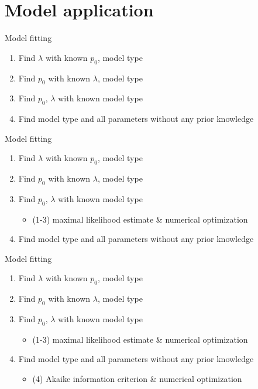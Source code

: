 \documentclass[american]{beamer}
\begin{document}
    \section{Model application}
    \begin{frame}{Model fitting}
        \begin{enumerate}
            \item Find $\lambda$ with known $p_{0}$, model type
            \item Find $p_{0}$ with known $\lambda$, model type
            \item Find $p_{0},\,\lambda$ with known model type
            \item Find model type and all parameters without any prior knowledge
        \end{enumerate}
    \end{frame}

    \begin{frame}{Model fitting}
        \begin{enumerate}
            \item Find $\lambda$ with known $p_{0}$, model type
            \item Find $p_{0}$ with known $\lambda$, model type
            \item Find $p_{0},\,\lambda$ with known model type
            \begin{itemize}
                \item (1-3) maximal likelihood estimate \& numerical optimization
            \end{itemize}
            \item Find model type and all parameters without any prior knowledge
        \end{enumerate}
    \end{frame}

    \begin{frame}{Model fitting}
        \begin{enumerate}
            \item Find $\lambda$ with known $p_{0}$, model type
            \item Find $p_{0}$ with known $\lambda$, model type
            \item Find $p_{0},\,\lambda$ with known model type
            \begin{itemize}
                \item (1-3) maximal likelihood estimate \& numerical optimization
            \end{itemize}
            \item Find model type and all parameters without any prior knowledge
            \begin{itemize}
                \item (4) Akaike information criterion \& numerical optimization
            \end{itemize}
        \end{enumerate}
    \end{frame}
\end{document}
